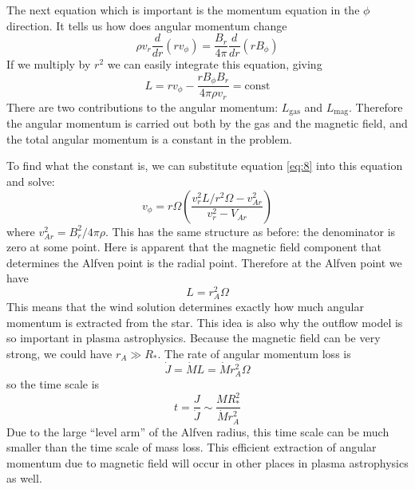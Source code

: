 \documentclass[letterpaper, 11pt]{article}
\newcommand{\Jmath}{J}
\numberwithin{equation}{section}
\numberwithin{figure}{section}
\begin{document}
The next equation which is important is the momentum equation in the $\phi$
direction. It tells us how does angular momentum change
\begin{equation}
  \label{eq:9}
  \rho v_r\frac{d}{dr}(rv_{\phi}) = \frac{B_r}{4\pi}\frac{d}{dr}(rB_\phi)
\end{equation}
If we multiply by $r^2$ we can easily integrate this equation, giving
\begin{equation}
  \label{eq:10}
  L = rv_{\phi} - \frac{rB_{\phi}B_r}{4\pi\rho v_r} = \text{const}
\end{equation}
There are two contributions to the angular momentum: $L_\mathrm{gas}$ and
$L_\mathrm{mag}$. Therefore the angular momentum is carried out both by the gas
and the magnetic field, and the total angular momentum is a constant in the
problem.

To find what the constant is, we can substitute equation \eqref{eq:8} into this
equation and solve:
\begin{equation}
  \label{eq:11}
  v_{\phi} = r\Omega \left( \frac{v_r^2L/r^2\Omega - v_{Ar}^2}{v_r^2 - V_{Ar}} \right)
\end{equation}
where $v_{Ar}^2 = B_r^2/4\pi\rho$. This has the same structure as before: the
denominator is zero at some point. Here is apparent that the magnetic field
component that determines the Alfven point is the radial point. Therefore at the
Alfven point we have
\begin{equation}
  \label{eq:12}
  L = r_A^2\Omega
\end{equation}
This means that the wind solution determines exactly how much angular momentum
is extracted from the star. This idea is also why the outflow model is so
important in plasma astrophysics. Because the magnetic field can be very strong,
we could have $r_A \gg R_{*}$. The rate of angular momentum loss is
\begin{equation}
  \label{eq:13}
  \dot{\Jmath} = \dot{M} L = \dot{M}r_A^2\Omega
\end{equation}
so the time scale is
\begin{equation}
  \label{eq:14}
  t = \frac{J}{\dot{\Jmath}} \sim \frac{MR_*^2}{\dot{M}r_{A}^2}
\end{equation}
Due to the large ``level arm'' of the Alfven radius, this time scale can be much
smaller than the time scale of mass loss. This efficient extraction of angular
momentum due to magnetic field will occur in other places in plasma astrophysics
as well.
\end{document}
